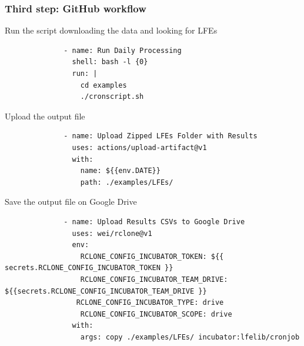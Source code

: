 \documentclass{beamer}
\begin{document}
	\begin{frame}[fragile]
		\frametitle{Third step: GitHub workflow}
		\begin{block}{Run the script downloading the data and looking for LFEs}
		\tiny{
		\begin{verbatim}
		      - name: Run Daily Processing
		        shell: bash -l {0}
		        run: |
		          cd examples
		          ./cronscript.sh
		\end{verbatim}
		}
		\end{block}
		\begin{block}{Upload the output file}
		\tiny{
		\begin{verbatim}
		      - name: Upload Zipped LFEs Folder with Results
		        uses: actions/upload-artifact@v1
		        with:
		          name: ${{env.DATE}}
		          path: ./examples/LFEs/
		\end{verbatim}
		}
		\end{block}
		\begin{block}{Save the output file on Google Drive}
		\tiny{
		\begin{verbatim}
		      - name: Upload Results CSVs to Google Drive
		        uses: wei/rclone@v1
		        env:
		          RCLONE_CONFIG_INCUBATOR_TOKEN: ${{ secrets.RCLONE_CONFIG_INCUBATOR_TOKEN }}
		          RCLONE_CONFIG_INCUBATOR_TEAM_DRIVE: ${{secrets.RCLONE_CONFIG_INCUBATOR_TEAM_DRIVE }}
 		         RCLONE_CONFIG_INCUBATOR_TYPE: drive
		          RCLONE_CONFIG_INCUBATOR_SCOPE: drive
		        with:
		          args: copy ./examples/LFEs/ incubator:lfelib/cronjob	
		\end{verbatim}
		}
		\end{block}
	\end{frame}
\end{document}
